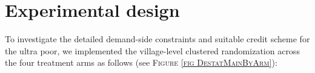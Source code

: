\section{Experimental design}
\label{SecExperimentalDesign}



	To investigate the detailed demand-side constraints and suitable credit scheme for the ultra poor, we implemented the village-level clustered randomization across the four treatment arms as follows (see \textsc{\normalsize Figure \ref{fig DestatMainByArm}}):


